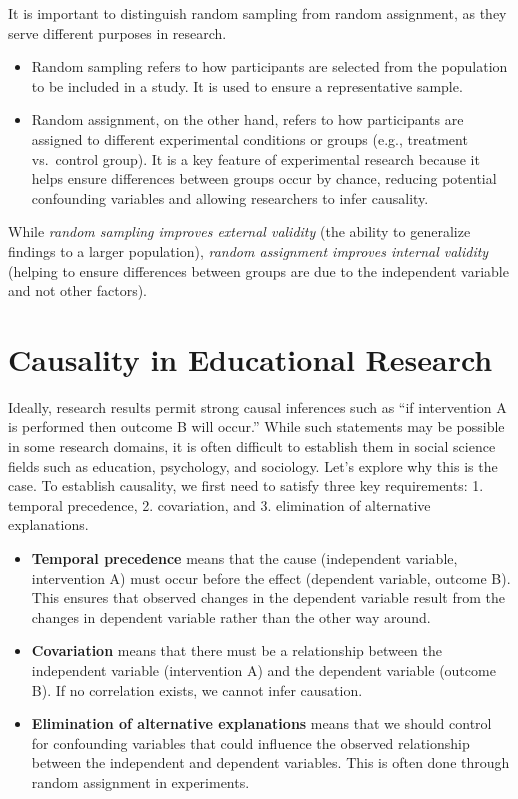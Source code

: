 \documentclass[
  letterpaper,
  DIV=11,
  numbers=noendperiod]{scrreprt}
\begin{document}
It is important to distinguish random sampling from random assignment,
as they serve different purposes in research.

\begin{itemize}
\item
  Random sampling refers to how participants are selected from the
  population to be included in a study. It is used to ensure a
  representative sample.
\item
  Random assignment, on the other hand, refers to how participants are
  assigned to different experimental conditions or groups (e.g.,
  treatment vs.~control group). It is a key feature of experimental
  research because it helps ensure differences between groups occur by
  chance, reducing potential confounding variables and allowing
  researchers to infer causality.
\end{itemize}

While \emph{random sampling improves external validity} (the ability to
generalize findings to a larger population), \emph{random assignment
improves internal validity} (helping to ensure differences between
groups are due to the independent variable and not other factors).

\section{Causality in Educational
Research}\label{causality-in-educational-research}

Ideally, research results permit strong causal inferences such as ``if
intervention A is performed then outcome B will occur.'' While such
statements may be possible in some research domains, it is often
difficult to establish them in social science fields such as education,
psychology, and sociology. Let's explore why this is the case. To
establish causality, we first need to satisfy three key requirements: 1.
temporal precedence, 2. covariation, and 3. elimination of alternative
explanations.

\begin{itemize}
\item
  \textbf{Temporal precedence} means that the cause (independent
  variable, intervention A) must occur before the effect (dependent
  variable, outcome B). This ensures that observed changes in the
  dependent variable result from the changes in dependent variable
  rather than the other way around.
\item
  \textbf{Covariation} means that there must be a relationship between
  the independent variable (intervention A) and the dependent variable
  (outcome B). If no correlation exists, we cannot infer causation.
\item
  \textbf{Elimination of alternative explanations} means that we should
  control for confounding variables that could influence the observed
  relationship between the independent and dependent variables. This is
  often done through random assignment in experiments.
\end{itemize}
\end{document}
